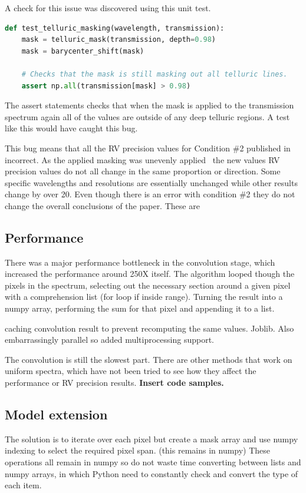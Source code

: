 A check for this issue was discovered using this unit test.
\begin{lstlisting}[language=Python, caption=Example unit test to catch masking bug.]
def test_telluric_masking(wavelength, transmission):
    mask = telluric_mask(transmission, depth=0.98)
    mask = barycenter_shift(mask)

    # Checks that the mask is still masking out all telluric lines.
    assert np.all(transmission[mask] > 0.98)
\end{lstlisting}
The assert statements checks that when the mask is applied to the transmission spectrum again all of the values are outside of any deep telluric regions. A test like this would have caught this bug.

This bug means that all the RV precision values for Condition \#2 published in~\citet{figueira_radial_2016} incorrect. As the applied masking was unevenly applied~\citet{figueira_radial_2016} the new values RV precision values do not all change in the same proportion or direction. Some specific wavelengths and resolutions are essentially unchanged while other results change by over 20\mps.  Even though there is an error with condition \#2 they do not change the overall conclusions of the paper. These are 

 \subsection{Performance}

     There was a major performance bottleneck in the convolution stage, which increased the performance around 250X itself. The algorithm looped though the pixels in the spectrum, selecting out the necessary section around a given pixel with a comprehension list (for loop if inside range). Turning the result into a numpy array, performing the sum for that pixel and appending it to a list.


caching convolution result to prevent recomputing the same values. Joblib.  Also embarrassingly parallel so added multiprocessing support.

The convolution is still the slowest part. There are other methods that work on uniform spectra, which have not been tried to see how they affect the performance or RV precision results.
\textbf{Insert code samples.}


\subsection{Model extension}
The solution is to iterate over each pixel but create a mask array and use numpy indexing to select the required pixel span. (this remains in numpy)
These operations all remain in numpy so do not waste time converting between lists and numpy arrays, in which Python need to constantly check and convert the type of each item.

